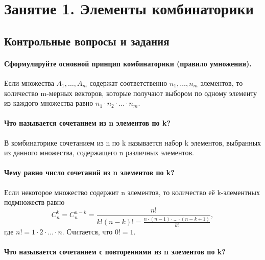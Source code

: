 \documentclass{book}
\begin{document}
\tableofcontents

\pagestyle{plain}

\chapter*{Занятие 1. Элементы комбинаторики}

\section*{Контрольные вопросы и задания}

\subsubsection*{Сформулируйте основной принцип комбинаторики (правило умножения).}

Если множества
$A_1,  \dotsc , A_m$
содержат соответственно $n_1,  \dotsc , n_m$
элементов, то количество m-мерных векторов, которые получают выбором по одному элементу из каждого множества равно
$n_1\cdot n_2\cdot \dotsc \cdot n_m$.

\subsubsection*{Что называется сочетанием из n элементов по k?}

В комбинаторике сочетанием из n по k называется набор k элементов, выбранных из данного множества, содержащего n различных элементов.

\subsubsection*{Чему равно число сочетаний из n элементов по k?}

Если некоторое множество содержит n элементов, то количество её k-элементных подмножеств равно
$$ C_n^k = C_n^{n-k} = \frac{n!}{k!\left(n-k\right)! = \frac{n\cdot\left(n-1\right) \cdot \dotsc \cdot \left( n-k+1 \right) }{k!}} , $$
где $n!=1\cdot 2\cdot \dotsc \cdot n$.
Считается, что $0!=1$.

\subsubsection*{Что называется сочетанием с повторениями из n элементов по k?}
\end{document}
